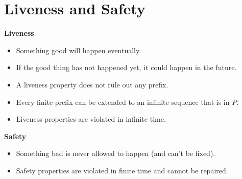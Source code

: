 \documentclass{article}
\begin{document}
\section{Liveness and Safety}
\textbf{Liveness}
\begin{itemize}
    \item Something good will happen eventually.
    \item If the good thing has not happened yet, it could happen in the future.
    \item A liveness property does not rule out any prefix.
    \item Every finite prefix can be extended to an infinite sequence that is in $P$.
    \item Liveness properties are violated in infinite time.
\end{itemize}
\textbf{Safety}
\begin{itemize}
    \item Something bad is never allowed to happen (and can't be fixed).
    \item Safety properties are violated in finite time and cannot be repaired.
\end{itemize}
\end{document}
